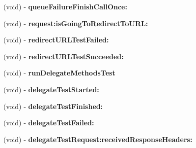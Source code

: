 \begin{DoxyCompactItemize}
\item 
\hypertarget{interface_a_s_i_network_queue_tests_07_08_af1a49ac2b9e5ff33f87f3e09f6e4a313}{
(void) -\/ {\bfseries queue\-Failure\-Finish\-Call\-Once\-:}}
\label{interface_a_s_i_network_queue_tests_07_08_af1a49ac2b9e5ff33f87f3e09f6e4a313}

\item 
\hypertarget{interface_a_s_i_network_queue_tests_07_08_a9c8b850314922591e1732a6167fab9c1}{
(void) -\/ {\bfseries request\-:is\-Going\-To\-Redirect\-To\-U\-R\-L\-:}}
\label{interface_a_s_i_network_queue_tests_07_08_a9c8b850314922591e1732a6167fab9c1}

\item 
\hypertarget{interface_a_s_i_network_queue_tests_07_08_a31a782738cbfac85a60c92e87dd07972}{
(void) -\/ {\bfseries redirect\-U\-R\-L\-Test\-Failed\-:}}
\label{interface_a_s_i_network_queue_tests_07_08_a31a782738cbfac85a60c92e87dd07972}

\item 
\hypertarget{interface_a_s_i_network_queue_tests_07_08_a02802eb48180e644ceee78ca4840607d}{
(void) -\/ {\bfseries redirect\-U\-R\-L\-Test\-Succeeded\-:}}
\label{interface_a_s_i_network_queue_tests_07_08_a02802eb48180e644ceee78ca4840607d}

\item 
\hypertarget{interface_a_s_i_network_queue_tests_07_08_aac272d1e4ebf8932ab723637f3abe58c}{
(void) -\/ {\bfseries run\-Delegate\-Methods\-Test}}
\label{interface_a_s_i_network_queue_tests_07_08_aac272d1e4ebf8932ab723637f3abe58c}

\item 
\hypertarget{interface_a_s_i_network_queue_tests_07_08_ad63bd013de90e522e12f2bba603c20d7}{
(void) -\/ {\bfseries delegate\-Test\-Started\-:}}
\label{interface_a_s_i_network_queue_tests_07_08_ad63bd013de90e522e12f2bba603c20d7}

\item 
\hypertarget{interface_a_s_i_network_queue_tests_07_08_aa05a6ec84d2a71b363573187e70a6afa}{
(void) -\/ {\bfseries delegate\-Test\-Finished\-:}}
\label{interface_a_s_i_network_queue_tests_07_08_aa05a6ec84d2a71b363573187e70a6afa}

\item 
\hypertarget{interface_a_s_i_network_queue_tests_07_08_a3b74243c00c86e888ffc9cb271138dcb}{
(void) -\/ {\bfseries delegate\-Test\-Failed\-:}}
\label{interface_a_s_i_network_queue_tests_07_08_a3b74243c00c86e888ffc9cb271138dcb}

\item 
\hypertarget{interface_a_s_i_network_queue_tests_07_08_a46a23624618c0547cbcbb9ca82c798cb}{
(void) -\/ {\bfseries delegate\-Test\-Request\-:received\-Response\-Headers\-:}}
\label{interface_a_s_i_network_queue_tests_07_08_a46a23624618c0547cbcbb9ca82c798cb}


\end{DoxyCompactItemize}
